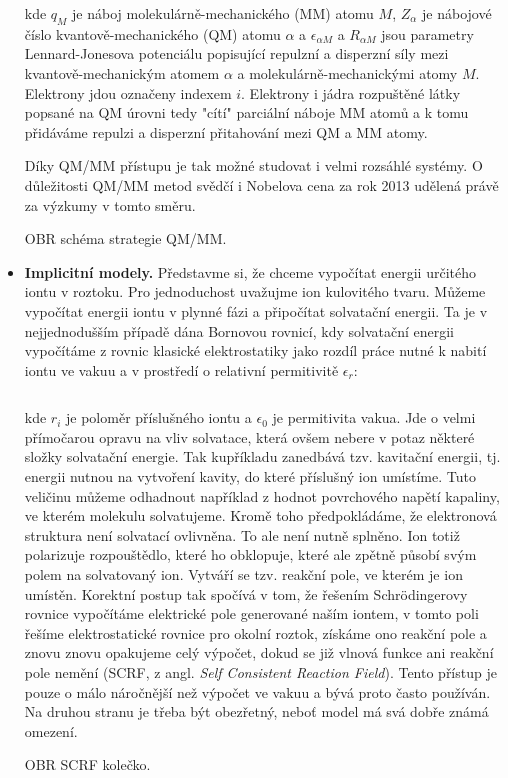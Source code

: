 \begin{itemize}
\begin{equation}
\label{rov:XXX}
\end{equation}

\noindent
kde $q_M$ je náboj molekulárně-mechanického (MM) atomu $M$, $Z_{\alpha}$ je nábojové číslo kvantově-mechanického (QM) atomu $\alpha$ a $\epsilon_{\alpha M}$ a $R_{\alpha M}$ jsou parametry Lennard-Jonesova potenciálu popisující repulzní a disperzní síly mezi kvantově-mechanickým atomem $\alpha$ a molekulárně-mechanickými atomy $M$. Elektrony jdou označeny indexem $i$. Elektrony i jádra rozpuštěné látky popsané na QM úrovni tedy "cítí" parciální náboje MM atomů a k tomu přidáváme repulzi a disperzní přitahování mezi QM a MM atomy. 

Díky QM/MM přístupu je tak možné studovat i velmi rozsáhlé systémy. O důležitosti QM/MM metod svědčí i Nobelova cena za rok 2013 udělená právě za výzkumy v tomto směru. 

\bigskip
OBR schéma strategie QM/MM.
\bigskip


\item \textbf{Implicitní modely.} Představme si, že chceme vypočítat energii určitého iontu v  roztoku. Pro jednoduchost uvažujme ion kulovitého tvaru. Můžeme vypočítat energii iontu v plynné fázi a připočítat solvatační energii. Ta je v nejjednodušším případě dána Bornovou rovnicí, kdy solvatační energii vypočítáme z rovnic klasické elektrostatiky jako rozdíl práce nutné k nabití iontu ve vakuu a v prostředí o relativní permitivitě $\epsilon_r$:


\begin{equation}
\label{rov:XXX}
\end{equation}


\noindent 
kde $r_i$ je poloměr příslušného iontu a $\epsilon_0$  je permitivita vakua. Jde o velmi přímočarou opravu na vliv solvatace, která ovšem nebere v potaz některé složky solvatační energie. Tak kupříkladu zanedbává tzv. kavitační energii, tj. energii nutnou na vytvoření kavity, do které příslušný ion umístíme. Tuto veličinu můžeme odhadnout například z hodnot povrchového napětí kapaliny, ve kterém molekulu solvatujeme. Kromě toho předpokládáme, že elektronová struktura není solvatací ovlivněna. To ale není nutně splněno. Ion totiž polarizuje rozpouštědlo, které ho obklopuje, které ale zpětně působí svým polem na solvatovaný ion. Vytváří se tzv. reakční pole, ve kterém je ion umístěn. Korektní postup tak spočívá v tom, že řešením Schr\"odingerovy rovnice vypočítáme elektrické pole generované naším iontem, v tomto poli řešíme elektrostatické rovnice pro okolní roztok, získáme ono reakční pole a znovu znovu opakujeme celý výpočet, dokud se již vlnová funkce ani reakční pole nemění (SCRF, z angl. \textit{Self Consistent Reaction Field}). Tento přístup je pouze o málo náročnější než výpočet ve vakuu a bývá proto často používán. Na druhou stranu je třeba být obezřetný, neboť model má svá dobře známá omezení.        

     
\bigskip
OBR SCRF kolečko.
\bigskip

\end{itemize}
